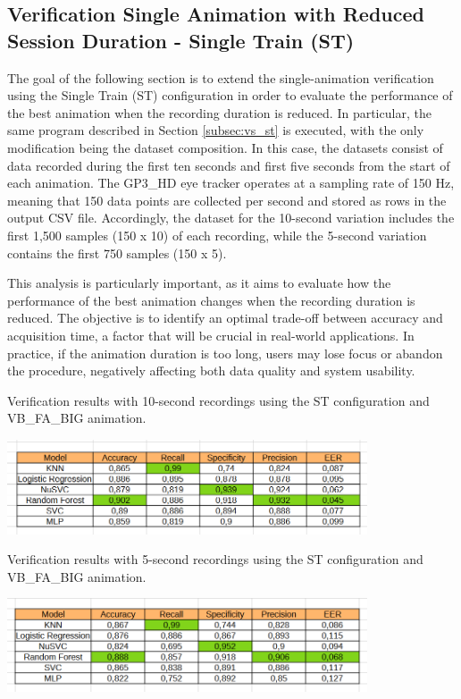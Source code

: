 \documentclass[12pt]{report}
\begin{document}
\subsection{Verification Single Animation with Reduced Session Duration - Single Train (ST)}

The goal of the following section is to extend the single-animation verification using the Single Train (ST) configuration in order to evaluate the performance of the best animation when the recording duration is reduced.
In particular, the same program described in Section \ref{subsec:vs_st} is executed, with the only modification being the dataset composition.
In this case, the datasets consist of data recorded during the first ten seconds and first five seconds from the start of each animation.
The GP3\_HD eye tracker operates at a sampling rate of 150 Hz, meaning that 150 data points are collected per second and stored as rows in the output CSV file.
Accordingly, the dataset for the 10-second variation includes the first 1,500 samples (150 x 10) of each recording, while the 5-second variation contains the first 750 samples (150 x 5).

This analysis is particularly important, as it aims to evaluate how the performance of the best animation changes when the recording duration is reduced.
The objective is to identify an optimal trade-off between accuracy and acquisition time, a factor that will be crucial in real-world applications.
In practice, if the animation duration is too long, users may lose focus or abandon the procedure, negatively affecting both data quality and system usability.

\begin{table}[ht]
    \centering
    \caption{Verification results with 10-second recordings using the ST configuration and VB\_FA\_BIG animation.}
    \includegraphics[width=0.8\textwidth]{Images/Results/Verification_single_five_ten/st/ten/VB_FA_BIG.png}
    \label{tab:VB_FA_BIG_10_st}
\end{table}

\begin{table}[ht]
    \centering
    \caption{Verification results with 5-second recordings using the ST configuration and VB\_FA\_BIG animation.}
    \includegraphics[width=0.8\textwidth]{Images/Results/Verification_single_five_ten/st/five/VB_FA_BIG.png}
    \label{tab:VB_FA_BIG_5_st}
\end{table}
\end{document}
